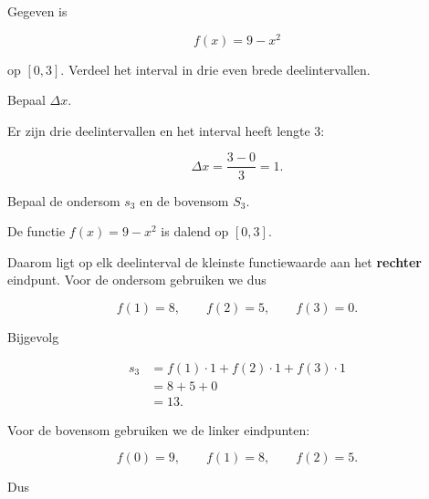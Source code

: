 \documentclass{ximera}
\begin{document}
\begin{oefening}{\oefB\ESS}

Gegeven is

\[
f(x)=9-x^2
\]

op \([0,3]\). Verdeel het interval in drie even brede deelintervallen.

\begin{center}
\end{center}

\begin{question}
Bepaal \(\Delta x\).

\begin{oplossing}
Er zijn drie deelintervallen en het interval heeft lengte \(3\):

\[
\Delta x=\frac{3-0}{3}=\boxed{1}.
\]
\end{oplossing}
\end{question}

\begin{question}
Bepaal de ondersom \(s_3\) en de bovensom \(S_3\).

\begin{oplossing}
De functie \(f(x)=9-x^2\) is dalend op \([0,3]\).

Daarom ligt op elk deelinterval de kleinste functiewaarde aan het
\textbf{rechter} eindpunt. Voor de ondersom gebruiken we dus

\[
f(1)=8,\qquad f(2)=5,\qquad f(3)=0.
\]

Bijgevolg

\[
\begin{aligned}
s_3
&=f(1)\cdot1+f(2)\cdot1+f(3)\cdot1\\
&=8+5+0\\
&=\boxed{13}.
\end{aligned}
\]

Voor de bovensom gebruiken we de linker eindpunten:

\[
f(0)=9,\qquad f(1)=8,\qquad f(2)=5.
\]

Dus


\end{oplossing}
\end{question}
\end{oefening}
\end{document}
